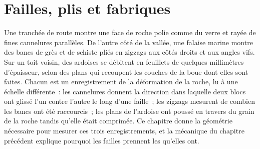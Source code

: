 \chapter{Failles, plis et fabriques}\label{ch:b1:faults-folds-fabrics}

Une tranchée de route montre une face de roche polie comme du verre et rayée de fines
cannelures parallèles. De l'autre côté de la vallée, une falaise marine montre des bancs de grès et
de schiste pliés en zigzags aux côtés droits et aux angles vifs. Sur un toit
voisin, des ardoises se débitent en feuillets de quelques millimètres d'épaisseur, selon des plans qui
recoupent les couches de la boue dont elles sont faites. Chacun est un enregistrement de la
déformation de la roche, lu à une échelle différente~: les cannelures donnent la direction
dans laquelle deux blocs ont glissé l'un contre l'autre le long d'une faille~; les zigzags mesurent de combien
les bancs ont été raccourcis~; les plans de l'ardoise ont poussé en travers du grain de la roche
tandis qu'elle était comprimée. Ce chapitre donne la géométrie nécessaire pour mesurer ces trois
enregistrements, et la mécanique du chapitre précédent explique pourquoi les failles prennent les
 qu'elles ont.

